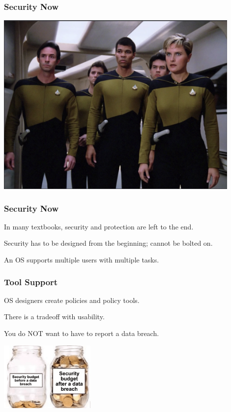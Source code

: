 \begin{frame}
\frametitle{Security Now}

\begin{center}
	\includegraphics[width=0.9\textwidth]{images/security-team.png}
\end{center}


\end{frame}


\begin{frame}
\frametitle{Security Now}

In many textbooks, security and protection are left to the end.

Security has to be designed from the beginning; cannot be bolted on.

An OS supports multiple users with multiple tasks.

\end{frame}


\begin{frame}
\frametitle{Tool Support}

OS designers create policies and policy tools.

There is a tradeoff with usability.

You do NOT want to have to report a data breach.

\begin{center}
	\includegraphics[width=0.35\textwidth]{images/security-budget.png}
\end{center}


\end{frame}


